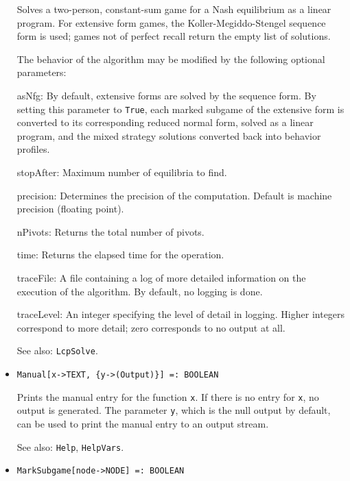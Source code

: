 \begin{itemize}
\bd
Solves a two-person, constant-sum game for a Nash equilibrium as a linear
program.  For extensive form games, the Koller-Megiddo-Stengel
sequence form is used; games not of perfect recall return the empty
list of solutions.

The behavior of the algorithm may be modified by the following optional
parameters:
\bd
\item
[asNfg:] By default, extensive forms are solved by the sequence form.
By setting this parameter to \verb+True+, each marked subgame of the
extensive form is converted to its corresponding reduced normal form,
solved as a linear program, and the mixed strategy solutions converted back
into behavior profiles.
\item
[stopAfter:] Maximum number of equilibria to find.  
\item
[precision:] Determines the precision of the computation. Default is
machine precision (floating point). 
\item
[nPivots:] Returns the total number of pivots.
\item
[time:] Returns the elapsed time for the operation.
\item
[traceFile:] A file containing a log of more detailed information on the
execution of the algorithm.  By default, no logging is done.
\item
[traceLevel:] An integer specifying the level of detail in logging.
Higher integers correspond to more detail; zero corresponds to no
output at all.
\ed
\item [See also:] \verb+LcpSolve+.
\ed


\item{}
\protect \large \begin{verbatim}
Manual[x->TEXT, {y->(Output)}] =: BOOLEAN 
\end{verbatim} \normalsize

\bd 
Prints the manual entry for the function \verb+x+.  If there is no
entry for \verb+x+, no output is generated. The parameter
\verb+y+, which is the null output by default, can be used to print
the manual entry to an output stream.
\item [See also:] \verb+Help+, \verb+HelpVars+.
\ed

\item{}
\protect \large \begin{verbatim}
MarkSubgame[node->NODE] =: BOOLEAN 
\end{verbatim} \normalsize


\end{itemize}

